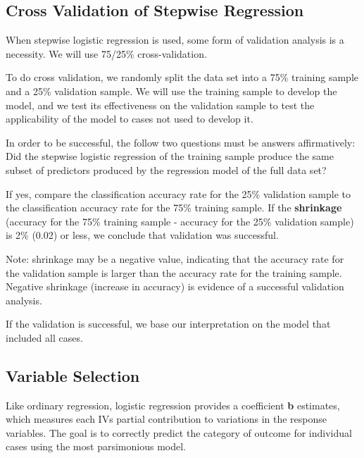 \documentclass[a4paper,12pt]{article}
\begin{document}
\subsection{Cross Validation of Stepwise Regression}
When stepwise logistic regression is used, some form of validation analysis is a necessity. We will use 75/25\% cross-validation.

To do cross validation, we randomly split the data set into a 75\% training sample and a 25\% validation sample. We will use the training sample to develop the model, and we test its effectiveness on the validation sample to test the applicability of the model to cases not used to develop it.

In order to be successful, the follow two questions must be answers affirmatively:
Did the stepwise logistic regression of the training sample produce the same subset of predictors produced by the regression model of the full data set?

If yes, compare the classification accuracy rate for the 25\% validation sample to the classification accuracy rate for the 75\% training sample. If the \textbf{shrinkage} (accuracy for the 75\% training sample - accuracy for the 25\% validation sample) is 2\% (0.02) or less, we conclude that validation was successful.

Note: shrinkage may be a negative value, indicating that the accuracy rate for the validation sample is larger than the accuracy rate for the training sample. Negative shrinkage (increase in accuracy) is evidence of a successful validation analysis.

If the validation is successful, we base our interpretation on the model that included all cases.

\subsection{Variable Selection}
Like ordinary regression, logistic regression provides a coefficient \textbf{b} estimates, which measures
each IVs partial contribution to variations in the response variables. The goal is to correctly predict
the category of outcome for individual cases using the most parsimonious model.
\end{document}
